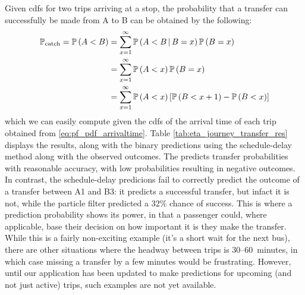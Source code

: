 Given \glspl{cdf} for two trips arriving at a stop, the probability that a transfer can successfully be made from A to B can be obtained by the following:
\begin{equation}
\label{eq:eta_total_prob}
\begin{split}
\mathbb{P}_\text{catch} =
\mathbb{P}\left(A < B\right) &= \sum_{x=1}^{\infty} \mathbb{P}\left(A < B\,|\,B = x\right)\mathbb{P}\left(B=x\right) \\
  &= \sum_{x=1}^\infty
    \mathbb{P}\left(A < x\right) \mathbb{P}\left(B=x\right) \\
  &= \sum_{x=1}^\infty
    \mathbb{P}\left(A < x\right) \left[
      \mathbb{P}\left(B < x + 1\right) - \mathbb{P}\left(B < x\right)
    \right]
\end{split}
\end{equation}
which we can easily compute given the \glspl{cdf} of the arrival time of each trip obtained from \cref{eq:pf_pdf_arrivaltime}. Table \cref{tab:eta_journey_transfer_res} displays the results, along with the binary predictions using the schedule-delay method along with the observed outcomes. The \pf{} predicts transfer probabilities with reasonable accuracy, with low probabilities resulting in negative outcomes. In contrast, the schedule-delay predicions fail to correctly predict the outcome of a transfer between A1 and B3: it predicts a successful transfer, but infact it is not, while the particle filter predicted a 32\% chance of success. This is where a prediction probability shows its power, in that a passenger could, where applicable, base their decision on how important it is they make the transfer. While this is a fairly non-exciting example (it's a short wait for the next bus), there are other situations where the headway between trips is 30--60~minutes, in which case missing a transfer by a few minutes would be frustrating. However, until our application has been updated to make predictions for upcoming (and not just active) trips, such examples are not yet available.


\begin{knitrout}\small
{}\color{fgcolor}\begin{table}

\caption{\label{tab:eta_journey_transfer_res}Transfer probabilities}
\centering
\fontsize{8}{10}\selectfont
{}
\end{table}


\end{knitrout}



